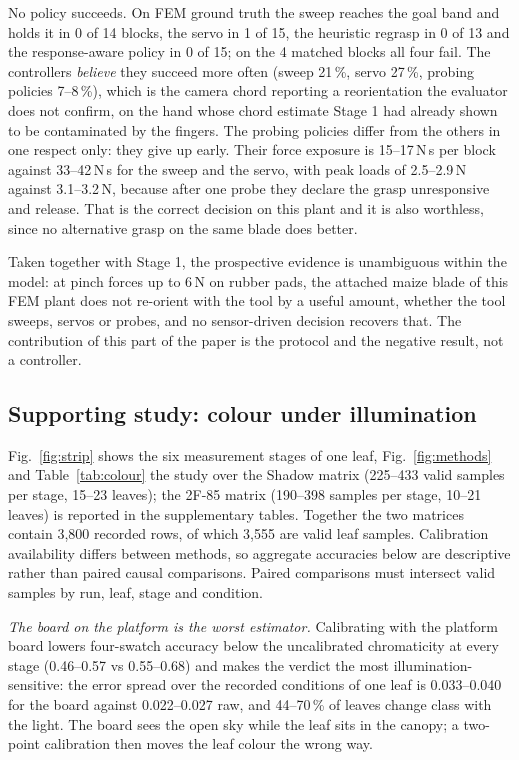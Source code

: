 \documentclass[letterpaper, 10 pt, conference]{ieeeconf}
\begin{document}
No policy succeeds. On FEM ground truth the sweep reaches the goal band and holds it in 0 of
14 blocks, the servo in 1 of 15, the heuristic regrasp in 0 of 13 and the response-aware policy
in 0 of 15; on the 4 matched blocks all four fail. The controllers \emph{believe} they
succeed more often (sweep 21\,\%, servo 27\,\%, probing policies 7--8\,\%), which is the
camera chord reporting a reorientation the evaluator does not confirm, on the hand whose
chord estimate Stage 1 had already shown to be contaminated by the fingers. The probing
policies differ from the others in one respect only: they give up early. Their force
exposure is 15--17\,N\,s per block against 33--42\,N\,s for the sweep and the servo, with
peak loads of 2.5--2.9\,N against 3.1--3.2\,N, because after one probe they declare the
grasp unresponsive and release. That is the correct decision on this plant and it is also
worthless, since no alternative grasp on the same blade does better.

Taken together with Stage 1, the prospective evidence is unambiguous within the model: at
pinch forces up to 6\,N on rubber pads, the attached maize blade of this FEM plant does not
re-orient with the tool by a useful amount, whether the tool sweeps, servos or probes, and no
sensor-driven decision recovers that. The contribution of this part of the paper is the
protocol and the negative result, not a controller.

\subsection{Supporting study: colour under illumination}\label{sec:colour}
Fig.~\ref{fig:strip} shows the six measurement stages of one leaf, Fig.~\ref{fig:methods}
and Table~\ref{tab:colour} the study over the Shadow matrix (225--433 valid samples per stage,
15--23 leaves); the 2F-85 matrix (190--398 samples per stage, 10--21 leaves) is reported in the supplementary tables. Together the two matrices contain 3,800
recorded rows, of which 3,555 are valid leaf samples. Calibration availability differs
between methods, so aggregate accuracies below are descriptive rather than paired causal
comparisons. Paired comparisons must intersect valid samples by run, leaf, stage and condition.

\emph{The board on the platform is the worst estimator.} Calibrating with the platform
board lowers four-swatch accuracy below the uncalibrated chromaticity at every stage
(0.46--0.57 vs 0.55--0.68) and makes the verdict the most illumination-sensitive: the error
spread over the recorded conditions of one leaf is 0.033--0.040 for the board against 0.022--0.027
raw, and 44--70\,\% of leaves change class with the light. The board sees the open sky while
the leaf sits in the canopy; a two-point calibration then moves the leaf colour the wrong way.
\end{document}
